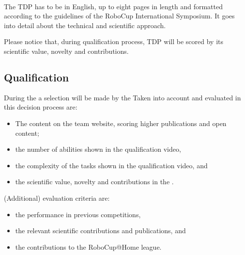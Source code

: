 ~\\\noindent The TDP has to be in English, up to eight pages in length and formatted according to the guidelines of the RoboCup International Symposium. It goes into detail about the technical and scientific approach.

Please notice that, during qualification process, TDP will be scored by its scientific value, novelty and contributions.


\subsection{Qualification}
\label{rule:qualification}

During the  a selection will be made by the  Taken into account and evaluated in this decision process are:
\begin{itemize}
	\item The content on the team website, scoring higher publications and open content;
	\item the number of abilities shown in the qualification video,
	\item the complexity of the tasks shown in the qualification video, and
	\item the scientific value, novelty and contributions in the . %
\end{itemize}
(Additional) evaluation criteria are: 
\begin{itemize}
	\item the performance in previous competitions, 
	\item the relevant scientific contributions and publications, and
	\item the contributions to the RoboCup@Home league.
\end{itemize}



